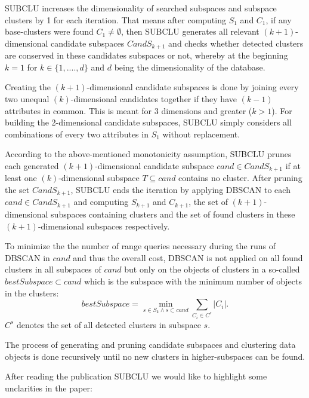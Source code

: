 SUBCLU increases the dimensionality of searched subspaces and subspace clusters by 1 for each iteration. That means after computing $S_{1}$ and $C_{1}$, if any base-clusters were found $C_{1} \neq \emptyset$, then SUBCLU generates all relevant $(k + 1)$-dimensional candidate subspaces $CandS_{k+1}$ and checks whether detected clusters are conserved in these candidates subspaces or not, whereby at the beginning $k = 1$ for $k \in \{1,....,d\}$ and $d$ being the dimensionality of the database.  

Creating the $(k + 1)$-dimensional candidate subspaces is done by joining every two unequal $(k)$-dimensional candidates together if they have $(k - 1)$ attributes in common. This is meant for 3 dimensions and greater ($k > 1$). For building the 2-dimensional candidate subspaces, SUBCLU simply considers all combinations of every two attributes in $S_{1}$ without replacement.

According to the above-mentioned monotonicity assumption, SUBCLU prunes each generated $(k + 1)$-dimensional candidate subspace $cand \in CandS_{k+1}$ if at least one $(k)$-dimensional subspace $T \subseteq cand$ contains no cluster. After pruning the set $CandS_{k+1}$, SUBCLU ends the iteration by applying DBSCAN to each $cand \in CandS_{k+1}$ and computing $S_{k+1}$ and $C_{k+1}$, the set of $(k + 1)$-dimensional subspaces containing clusters and the set of found clusters in these $(k + 1)$-dimensional subspaces respectively.

To minimize the the number of range queries necessary during the runs of DBSCAN in $cand$ and thus the overall cost, DBSCAN is not applied on all found clusters in all subspaces of $cand$ but only on the objects of clusters in a so-called $bestSubspace \subset cand$ which is the subspace with the minimum number of objects in the clusters:
\begin{equation}
bestSubspace = \min _{s\in S_{k}\wedge s\subset cand}\sum _{C_{i}\in C^{s}}|C_{i}|.
\end{equation}
$C^{s}$ denotes the set of all detected clusters in subspace $s$.

The process of generating and pruning candidate subspaces and clustering data objects is done recursively until no new clusters in higher-subspaces can be found.

After reading the publication SUBCLU \citep{subclu} we would like to highlight some unclarities in the paper:

